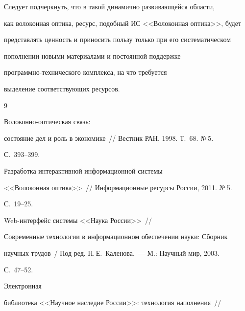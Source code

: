      


     Следует подчеркнуть, что в такой динамично развивающейся области, 


как волоконная оптика, ресурс, подобный ИС <<Волоконная оптика>>, будет 


пред\-став\-лять ценность и приносить пользу только при его систематическом 


пополнении новыми материалами и постоянной поддержке 


     про\-грам\-мно-тех\-ни\-че\-ско\-го комплекса, на что требуется 


выделение соответствующих ресурсов. 





{\small\frenchspacing


{%




\begin{thebibliography}{9}







      Волоконно-оптическая связь: 


состояние дел и роль в экономике~/\!\!/ Вестник РАН, 1998. Т.~68. №\,5. 


С.~393--399.




      Разработка интерактивной информационной системы 


<<Волоконная оптика>>~/\!\!/ Информационные ресурсы России, 2011. №\,5. 


С.~19--25.




      Web-интерфейс системы <<Наука России>>~/\!\!/ 


Современные технологии в информационном обеспечении науки: Сборник 


научных трудов~/ Под ред. Н.\,Е.~Каленова.~--- М.: Научный мир, 2003. 


С.~47--52.




      Электронная 


библиотека <<Научное наследие России>>: технология наполнения~/\!\!/ 



\end{thebibliography}}}
